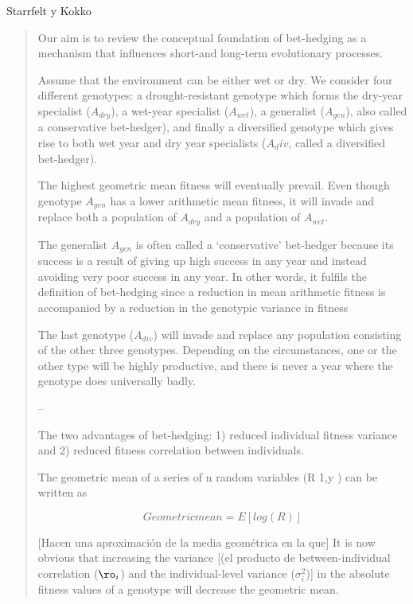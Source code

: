 \documentclass[a4paper,10pt]{article}
\begin{document}
Starrfelt y Kokko
\begin{quotation} \cite{starrfelt2012-bet}
    Our aim is to review the conceptual foundation of bet-hedging as a mechanism that influences short-and long-term evolutionary processes.
    
    Assume that the environment can be either wet or dry.
    We consider four different genotypes: a drought-resistant genotype which forms the dry-year specialist ($A_{dry}$), a wet-year specialist ($A_{wet}$), a generalist ($A_{gen}$), also called a conservative bet-hedger), and finally a diversified genotype which gives rise to both wet year and dry year specialists ($A_div$, called a diversified bet-hedger).
    
    The highest geometric mean fitness will eventually prevail.
    Even though genotype $A_{gen}$ has a lower arithmetic mean fitness, it will invade and replace both a population of $A_{dry}$ and a population of $A_{wet}$.
    
    The generalist $A_{gen}$ is often called a ‘conservative’ bet-hedger because its success is a result of giving up high success in any year and instead avoiding very poor success in any year.
    In other words, it fulfils the definition of bet-hedging since a reduction in mean arithmetic fitness is accompanied by a reduction in the genotypic variance in fitness
    
    The last genotype ($A_{div}$) will invade and replace any population consisting of the other three genotypes. 
    Depending on the circumstances, one or the other type will be highly productive, and there is never a year where the genotype does universally badly.
    
    -- 
    
    The two advantages of bet-hedging: 1) reduced individual fitness variance and 2) reduced fitness correlation between individuals.
    
    
    The geometric mean of a series of n random variables (R 1,y ) can be written as
    
    \begin{equation}
    Geometric mean = E[log(R)]
    \end{equation}
    
    [Hacen una aproximación de la media geométrica en la que] It is now obvious that increasing the variance [(el producto de between-individual correlation ($\ro_i$) and the individual-level variance ($\sigma_i^2$)] in the absolute fitness values of a genotype will decrease the geometric mean.
    

\end{quotation}
\end{document}

